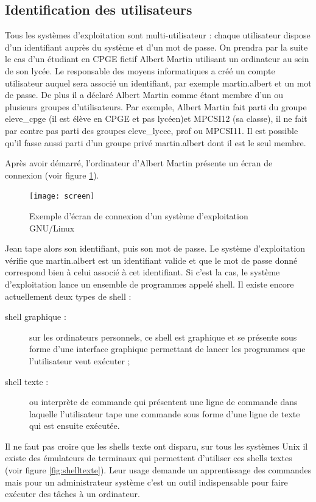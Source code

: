 \subsection{Identification des utilisateurs}
Tous les systèmes d'exploitation sont multi-utilisateur : chaque utilisateur dispose d'un identifiant auprès du système et d'un mot de passe. On prendra par la suite le cas d'un étudiant en CPGE fictif Albert Martin utilisant un ordinateur au sein de son lycée. Le responsable des moyens informatiques a créé un compte utilisateur auquel sera associé un identifiant, par exemple martin.albert et un mot de passe. De plus il a déclaré Albert Martin comme étant membre d'un ou plusieurs groupes d'utilisateurs. Par exemple, Albert Martin fait parti du groupe eleve\_cpge (il est élève en CPGE et pas lycéen)et MPCSI12 (sa classe), il ne fait par contre pas parti des groupes eleve\_lycee, prof ou MPCSI11. Il est possible qu'il fasse aussi parti d'un groupe privé martin.albert dont il est le seul membre.\par
Après avoir démarré, l'ordinateur d'Albert Martin présente un écran de connexion (voir figure \ref{fig:connexion}). 
\begin{figure}[ht]
  \centering
  \texttt{[image: screen]}
  \caption{\footnotesize{Exemple d'écran de connexion d'un système d'exploitation GNU/Linux}}
  \label{fig:connexion}
\end{figure}
Jean tape alors son identifiant, puis son mot de passe. Le système d'exploitation vérifie que martin.albert est un identifiant valide et que le mot de passe donné correspond bien à celui associé à cet identifiant. Si c'est la cas, le système d'exploitation lance un ensemble de programmes appelé shell. Il existe encore actuellement deux types de shell :
\begin{description}
\item[shell graphique :] sur les ordinateurs personnels, ce shell est graphique et se présente sous forme d'une interface graphique permettant de lancer les programmes que l'utilisateur veut exécuter ;
\item[shell texte :] ou interprète de commande qui présentent une ligne de commande dans laquelle l'utilisateur tape une commande sous forme d'une ligne de texte qui est ensuite exécutée.
\end{description}
Il ne faut pas croire que les shells texte ont disparu, sur tous les systèmes Unix il existe des émulateurs de terminaux qui permettent d'utiliser ces shells textes (voir figure \ref{fig:shelltexte}). Leur usage demande un apprentissage des commandes mais pour un administrateur système c'est un outil indispensable pour faire exécuter des tâches à un ordinateur. 
